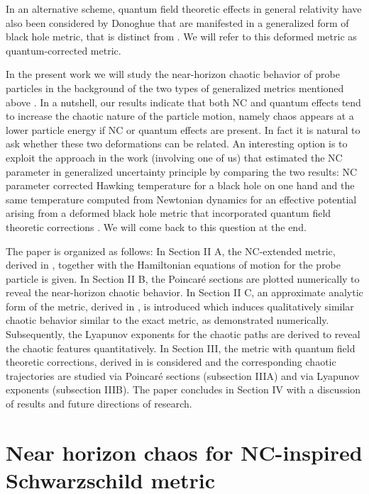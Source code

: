 \documentclass[aps,prd,showpacs,nofootinbib,floats,floatfix,preprintnumbers,groupedaddress,twocolumn]{revtex4-1}
\begin{document}
In an alternative scheme, quantum field theoretic effects in general relativity have also been considered by Donoghue \cite{don} that are manifested in a generalized form of black hole metric, that is distinct from \cite{nic}. We will refer to this deformed metric as quantum-corrected metric.

In the present work we will study the near-horizon chaotic behavior  of probe particles in the background of the two types of generalized metrics mentioned above \cite{nic,don}. In a nutshell, our results indicate that both NC and quantum effects tend to increase the chaotic nature of the particle motion, namely chaos appears at a lower particle energy if NC or quantum effects are present.  In fact it is natural to ask whether these two deformations can be related. An interesting option is to exploit the approach in the work (involving one of us) \cite{elias} that estimated the NC parameter in generalized uncertainty principle by comparing the two results: NC parameter corrected Hawking temperature for a black hole on one hand and the same temperature computed from  Newtonian dynamics for an effective potential arising from a deformed black hole metric that incorporated quantum field theoretic corrections \cite{don}. We will come back to this question at the end.

The paper is organized as follows: In Section II A, the NC-extended metric, derived in \cite{nic}, together with the Hamiltonian equations of motion for the probe particle is given. In Section II B, the Poincar\'e sections are plotted numerically to reveal the near-horizon chaotic behavior. In Section II C, an approximate analytic form of the metric, derived in  \cite{nic}, is introduced which induces qualitatively similar chaotic behavior similar to the exact metric, as demonstrated  numerically. Subsequently, the Lyapunov exponents for the chaotic paths are derived to reveal the chaotic features quantitatively. In Section III, the metric with quantum field theoretic corrections, derived in \cite{don} is considered and the corresponding chaotic trajectories are studied via Poincar\'e sections (subsection IIIA) and via Lyapunov exponents (subsection IIIB). The paper concludes in Section IV with a discussion of results and future directions of research.
%
%
%
%
\section{Near horizon chaos for  NC-inspired Schwarzschild metric\label{NC SCH}}
%
%
%
%
%
\end{document}
